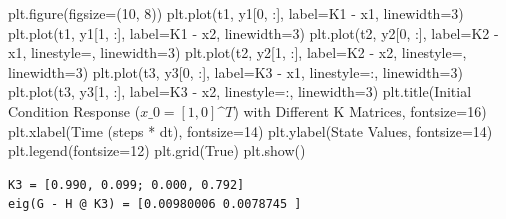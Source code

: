 \documentclass[
  letterpaper,
  DIV=11,
  numbers=noendperiod,
  oneside]{scrartcl}
\newenvironment{Shaded}{\begin{snugshade}}{\end{snugshade}}
\newcommand{\DecValTok}[1]{\textcolor[rgb]{0.68,0.00,0.00}{#1}}
\newcommand{\NormalTok}[1]{\textcolor[rgb]{0.00,0.23,0.31}{#1}}
\newcommand{\OperatorTok}[1]{\textcolor[rgb]{0.37,0.37,0.37}{#1}}
\newcommand{\StringTok}[1]{\textcolor[rgb]{0.13,0.47,0.30}{#1}}
\newcommand{\VariableTok}[1]{\textcolor[rgb]{0.07,0.07,0.07}{#1}}
\begin{document}
\begin{Shaded}
\begin{Highlighting}[numbers=left,,]
\NormalTok{plt.figure(figsize}\OperatorTok{=}\NormalTok{(}\DecValTok{10}\NormalTok{, }\DecValTok{8}\NormalTok{))}
\NormalTok{plt.plot(t1, y1[}\DecValTok{0}\NormalTok{, :], label}\OperatorTok{=}\StringTok{\textquotesingle{}K1 {-} x1\textquotesingle{}}\NormalTok{, linewidth}\OperatorTok{=}\DecValTok{3}\NormalTok{)}
\NormalTok{plt.plot(t1, y1[}\DecValTok{1}\NormalTok{, :], label}\OperatorTok{=}\StringTok{\textquotesingle{}K1 {-} x2\textquotesingle{}}\NormalTok{, linewidth}\OperatorTok{=}\DecValTok{3}\NormalTok{)}
\NormalTok{plt.plot(t2, y2[}\DecValTok{0}\NormalTok{, :], label}\OperatorTok{=}\StringTok{\textquotesingle{}K2 {-} x1\textquotesingle{}}\NormalTok{, linestyle}\OperatorTok{=}\StringTok{\textquotesingle{}{-}{-}\textquotesingle{}}\NormalTok{, linewidth}\OperatorTok{=}\DecValTok{3}\NormalTok{) }
\NormalTok{plt.plot(t2, y2[}\DecValTok{1}\NormalTok{, :], label}\OperatorTok{=}\StringTok{\textquotesingle{}K2 {-} x2\textquotesingle{}}\NormalTok{, linestyle}\OperatorTok{=}\StringTok{\textquotesingle{}{-}{-}\textquotesingle{}}\NormalTok{, linewidth}\OperatorTok{=}\DecValTok{3}\NormalTok{) }
\NormalTok{plt.plot(t3, y3[}\DecValTok{0}\NormalTok{, :], label}\OperatorTok{=}\StringTok{\textquotesingle{}K3 {-} x1\textquotesingle{}}\NormalTok{, linestyle}\OperatorTok{=}\StringTok{\textquotesingle{}:\textquotesingle{}}\NormalTok{, linewidth}\OperatorTok{=}\DecValTok{3}\NormalTok{) }
\NormalTok{plt.plot(t3, y3[}\DecValTok{1}\NormalTok{, :], label}\OperatorTok{=}\StringTok{\textquotesingle{}K3 {-} x2\textquotesingle{}}\NormalTok{, linestyle}\OperatorTok{=}\StringTok{\textquotesingle{}:\textquotesingle{}}\NormalTok{, linewidth}\OperatorTok{=}\DecValTok{3}\NormalTok{) }
\NormalTok{plt.title(}\StringTok{\textquotesingle{}Initial Condition Response ($x\_0=[1, 0]\^{}T$) with Different K Matrices\textquotesingle{}}\NormalTok{, fontsize}\OperatorTok{=}\DecValTok{16}\NormalTok{) }
\NormalTok{plt.xlabel(}\StringTok{\textquotesingle{}Time (steps * dt)\textquotesingle{}}\NormalTok{, fontsize}\OperatorTok{=}\DecValTok{14}\NormalTok{) }
\NormalTok{plt.ylabel(}\StringTok{\textquotesingle{}State Values\textquotesingle{}}\NormalTok{, fontsize}\OperatorTok{=}\DecValTok{14}\NormalTok{) }
\NormalTok{plt.legend(fontsize}\OperatorTok{=}\DecValTok{12}\NormalTok{)}
\NormalTok{plt.grid(}\VariableTok{True}\NormalTok{) }
\NormalTok{plt.show()}
\end{Highlighting}
\end{Shaded}

\begin{verbatim}
K3 = [0.990, 0.099; 0.000, 0.792]
eig(G - H @ K3) = [0.00980006 0.0078745 ]
\end{verbatim}
\end{document}
